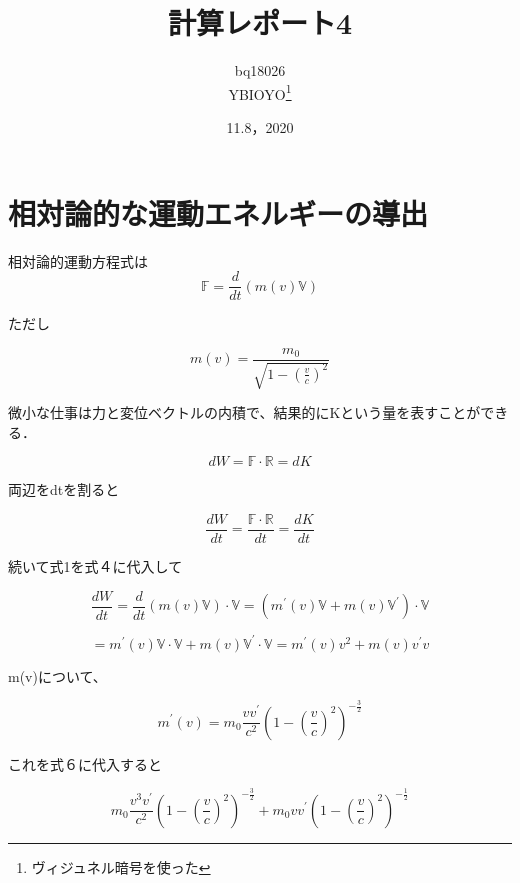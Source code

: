 \documentclass[xelatex,ja=standard,jafont=noto]{bxjsarticle}
\title{計算レポート4	}
\author{bq18026\\YBIOYO\footnote{ヴィジュネル暗号を使った} }
\date{11.8，2020}
\begin{document}
\maketitle

\section{相対論的な運動エネルギーの導出}

相対論的運動方程式は
\begin{equation}
    \mathbb{F}=\frac{d}{dt}(m(v)\mathbb{V})
\end{equation}

ただし

\begin{equation}
    m(v)=\frac{m_{0}}{\sqrt{1-(\frac{v}{c})^{2}}}
\end{equation}

微小な仕事は力と変位ベクトルの内積で、結果的にKという量を表すことができる．

\begin{equation}
    dW=\mathbb{F}\cdot\mathbb{R}=dK
\end{equation}

両辺をdtを割ると

\begin{equation}
    \frac{dW}{dt}=\frac{\mathbb{F}\cdot\mathbb{R}}{dt}=\frac{dK}{dt}
\end{equation}

続いて式1を式４に代入して

\begin{equation}
    \frac{dW}{dt}=\frac{d}{dt}(m(v)\mathbb{V})\cdot\mathbb{V}=(m^{'}(v)\mathbb{V}+m(v)\mathbb{V}^{'})\cdot\mathbb{V}
\end{equation}

\begin{equation}
    =m^{'}(v)\mathbb{V}\cdot\mathbb{V}+m(v)\mathbb{V}^{'}\cdot\mathbb{V}=m^{'}(v)v^{2}+m(v)v^{'}v
\end{equation}

m(v)について、

\begin{equation}
    m^{'}(v)=m_{0}\frac{vv^{'}}{c^{2}}(1-(\frac{v}{c})^{2})^{-\frac{3}{2}}
\end{equation}

これを式６に代入すると

\begin{equation}
    m_{0}\frac{v^{3}v^{'}}{c^{2}}(1-(\frac{v}{c})^{2})^{-\frac{3}{2}}+m_{0}vv^{'}(1-(\frac{v}{c})^{2})^{-\frac{1}{2}}
\end{equation}
\end{document}
